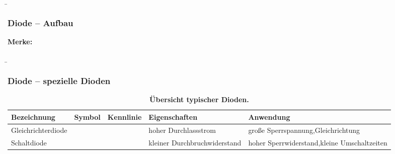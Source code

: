 \begin{frame}
    \b{\frametitle{Diode -- Aufbau}
        \textbf{Merke:}
        \begin{itemize}
        \end{itemize}
        }
\end{frame}

\begin{frame}
    \b{
        \frametitle{Diode -- spezielle Dioden}
        \begin{table}[H]
            \centering 
            \begin{tabular}{ |p{2.1cm}|p{1.4cm}|p{3.2cm}|p{2.8cm}|p{3cm}| }
                \hline
                \textbf{Bezeichnung} & \textbf{Symbol} & \textbf{Kennlinie} & \textbf{Eigenschaften} & \textbf{Anwendung} \\
                \hline
                Gleich\-richter\-diode  
                &
                \begin{minipage}[t][2.6cm][c]{1.4cm}
                    \centering 
                \end{minipage}
                & 
                \begin{minipage}[t][2.6cm][c]{3.3cm}
                    \centering 
                \end{minipage}
                & 
                hoher Durchlassstrom &
                 große Sperrspannung,\newline Gleichrichtung\\
                \hline
                Schalt\-diode 
                &
                \begin{minipage}[t][2.6cm][c]{1.4cm}
                    \centering 
                \end{minipage}
                & 
                \begin{minipage}[t][2.6cm][c]{3.3cm}
                    \centering 
                \end{minipage}
                & 
                kleiner Durchbruchwiderstand &
                hoher Sperrwiderstand,\newline kleine Umschaltzeiten\\
                \hline
            \end{tabular}
            \caption{\textbf{Übersicht typischer Dioden.}}
        \end{table}
    }

\end{frame}

